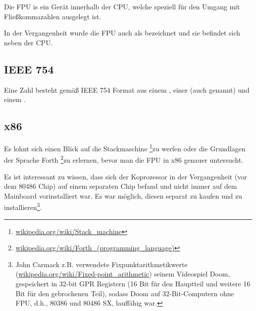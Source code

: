 \section{\FPUChapterName}
\label{sec:FPU}

\newcommand{\FNURLSTACK}{\footnote{\href{http://go.yurichev.com/17123}{wikipedia.org/wiki/Stack\_machine}}}
\newcommand{\FNURLFORTH}{\footnote{\href{http://go.yurichev.com/17124}{wikipedia.org/wiki/Forth\_(programming\_language)}}}
\newcommand{\FNURLIEEE}{\footnote{\href{http://go.yurichev.com/17125}{wikipedia.org/wiki/IEEE\_floating\_point}}}
\newcommand{\FNURLSP}{\footnote{\href{http://go.yurichev.com/17126}{wikipedia.org/wiki/Single-precision\_floating-point\_format}}}
\newcommand{\FNURLDP}{\footnote{\href{http://go.yurichev.com/17127}{wikipedia.org/wiki/Double-precision\_floating-point\_format}}}
\newcommand{\FNURLEP}{\footnote{\href{http://go.yurichev.com/17128}{wikipedia.org/wiki/Extended\_precision}}}

Die \ac{FPU} is ein Gerät innerhalb der \ac{CPU}, welche speziell für den Umgang
mit Fließkommazahlen ausgelegt ist. 

In der Vergangenheit wurde die \ac{FPU} auch als  bezeichnet und
sie befindet sich neben der \ac{CPU}. 

\subsection{IEEE 754}

Eine Zahl besteht gemäß IEEE 754 Format aus einem , einer
 (auch  genannt) und einem . 

\subsection{x86}

Es lohnt sich einen Blick auf die Stackmaschine \FNURLSTACK zu werfen oder die
Grundlagen der Sprache Forth \FNURLFORTH zu erlernen, bevor man die \ac{FPU} in
x86 genauer untersucht. 

Es ist interessant zu wissen, dass sich der Koprozessor in der Vergangenheit
(vor dem 80486 Chip) auf einem separaten Chip befand und nicht immer auf dem
Mainboard vorinstalliert war. Es war möglich, diesen separat zu kaufen und zu
installieren\footnote{John Carmack z.B. verwendete Fixpunktarithmetikwerte 
(\href{http://go.yurichev.com/17356}{wikipedia.org/wiki/Fixed-point\_arithmetic})
seinem Videospiel Doom, gespeichert in 32-bit \ac{GPR} Registern (16 Bit
für den Hauptteil und weitere 16 Bit für den gebrochenen Teil), sodass Doom
auf 32-Bit-Computern ohne FPU, d.h., 80386 und 80486 SX, lauffähig war.}.

